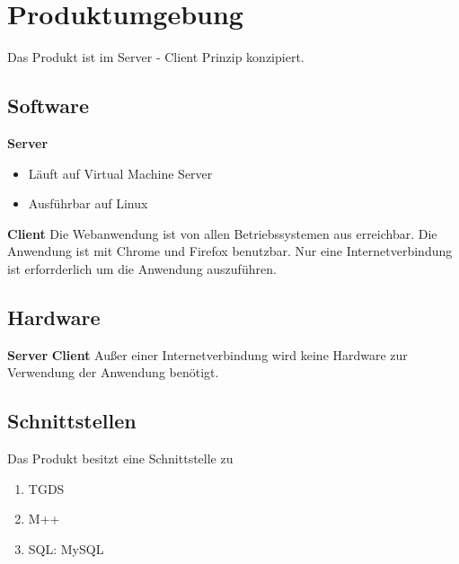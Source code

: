 \chapter{Produktumgebung}
Das Produkt ist im Server - Client Prinzip konzipiert.

\section{Software}
\textbf{Server}
\begin{itemize}
    \item Läuft auf Virtual Machine Server
    \item Ausführbar auf Linux
\end{itemize}
\textbf{Client} Die Webanwendung ist von allen Betriebssystemen aus erreichbar. Die Anwendung ist mit Chrome und Firefox benutzbar. Nur eine Internetverbindung ist erforrderlich um die Anwendung auszuführen.
\section{Hardware}
\textbf{Server}
\textbf{Client}
Außer einer Internetverbindung wird keine Hardware zur Verwendung der Anwendung benötigt.
\newpage
\section{Schnittstellen}
\renewcommand{\labelenumi}{/S\arabic{enumi}0/}
Das Produkt besitzt eine Schnittstelle zu
\begin{enumerate}
    \setlength\itemsep{-1em}
    \item TGDS
    \item M++
    \item SQL: MySQL
\end{enumerate}
